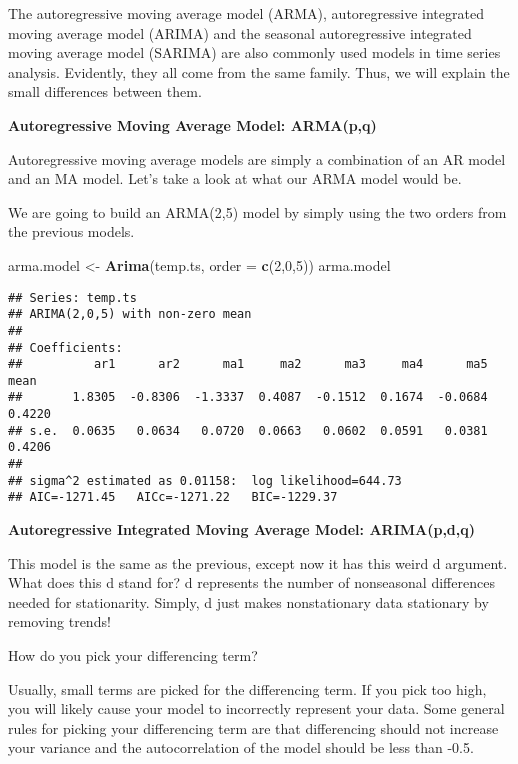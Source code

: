 \documentclass[
]{book}
\newenvironment{Shaded}{\begin{snugshade}}{\end{snugshade}}
\newcommand{\DataTypeTok}[1]{\textcolor[rgb]{0.13,0.29,0.53}{#1}}
\newcommand{\DecValTok}[1]{\textcolor[rgb]{0.00,0.00,0.81}{#1}}
\newcommand{\KeywordTok}[1]{\textcolor[rgb]{0.13,0.29,0.53}{\textbf{#1}}}
\newcommand{\NormalTok}[1]{#1}
\newcommand{\StringTok}[1]{\textcolor[rgb]{0.31,0.60,0.02}{#1}}
\begin{document}
The autoregressive moving average model (ARMA), autoregressive integrated moving average model (ARIMA) and the seasonal autoregressive integrated moving average model (SARIMA) are also commonly used models in time series analysis. Evidently, they all come from the same family. Thus, we will explain the small differences between them.

\textbf{Autoregressive Moving Average Model: ARMA(p,q)}

Autoregressive moving average models are simply a combination of an AR model and an MA model. Let's take a look at what our ARMA model would be.

We are going to build an ARMA(2,5) model by simply using the two orders from the previous models.

\begin{Shaded}
\begin{Highlighting}[]
\NormalTok{arma.model <-}\StringTok{ }\KeywordTok{Arima}\NormalTok{(temp.ts, }\DataTypeTok{order =} \KeywordTok{c}\NormalTok{(}\DecValTok{2}\NormalTok{,}\DecValTok{0}\NormalTok{,}\DecValTok{5}\NormalTok{))}
\NormalTok{arma.model}
\end{Highlighting}
\end{Shaded}

\begin{verbatim}
## Series: temp.ts 
## ARIMA(2,0,5) with non-zero mean 
## 
## Coefficients:
##          ar1      ar2      ma1     ma2      ma3     ma4      ma5    mean
##       1.8305  -0.8306  -1.3337  0.4087  -0.1512  0.1674  -0.0684  0.4220
## s.e.  0.0635   0.0634   0.0720  0.0663   0.0602  0.0591   0.0381  0.4206
## 
## sigma^2 estimated as 0.01158:  log likelihood=644.73
## AIC=-1271.45   AICc=-1271.22   BIC=-1229.37
\end{verbatim}

\textbf{Autoregressive Integrated Moving Average Model: ARIMA(p,d,q)}

This model is the same as the previous, except now it has this weird d argument. What does this d stand for? d represents the number of nonseasonal differences needed for stationarity. Simply, d just makes nonstationary data stationary by removing trends!

How do you pick your differencing term?

Usually, small terms are picked for the differencing term. If you pick too high, you will likely cause your model to incorrectly represent your data. Some general rules for picking your differencing term are that differencing should not increase your variance and the autocorrelation of the model should be less than -0.5.
\end{document}
